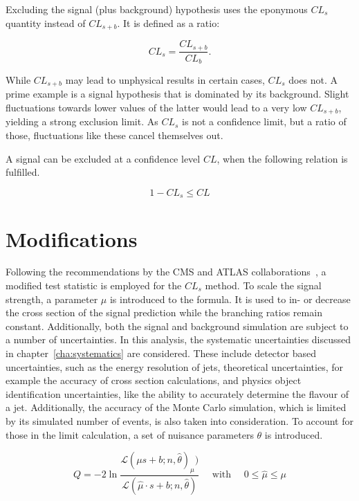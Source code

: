 Excluding the signal (plus background) hypothesis uses the eponymous $CL_s$ quantity instead of $CL_{s+b}$. It is defined as a ratio:

\begin{equation}
  \label{eq:cls}
  CL_s = \frac{CL_{s+b}}{CL_b}.
\end{equation}

\noindent While $CL_{s+b}$ may lead to unphysical results in certain cases, $CL_s$ does not. A prime example is a signal hypothesis that is dominated by its background. Slight fluctuations towards lower values of the latter would lead to a very low $CL_{s+b}$, yielding a strong exclusion limit. As $CL_s$ is not a confidence limit, but a ratio of those, fluctuations like these cancel themselves out.

A signal can be excluded at a confidence level $CL$, when the following relation is fulfilled.

\begin{equation}
  \label{eq:cl-excl}
  1 - CL_s \leq CL
\end{equation}

\section{Modifications}
\label{sec:mods}

Following the recommendations by the CMS and ATLAS collaborations~\cite{clsmod}, a modified test statistic is employed for the $CL_s$ method. To scale the signal strength, a parameter $\mu$ is introduced to the formula. It is used to in- or decrease the cross section of the signal prediction while the branching ratios remain constant. Additionally, both the signal and background simulation are subject to a number of uncertainties. In this analysis, the systematic uncertainties discussed in chapter~\ref{cha:systematics} are considered. These include detector based uncertainties, such as the energy resolution of jets, theoretical uncertainties, for example the accuracy of cross section calculations, and physics object identification uncertainties, like the ability to accurately determine the flavour of a jet. Additionally, the accuracy of the Monte Carlo simulation, which is limited by its simulated number of events, is also taken into consideration. To account for those in the limit calculation, a set of nuisance parameters $\theta$ is introduced.

\begin{equation}
  \label{eq:q-mod}
  Q = - 2 \ln{ \frac{\mathcal{L} (\mu s + b; n, \hat{\theta})_\mu) }{ \mathcal{L} (\hat{\mu} \cdot s + b; n, \hat{\theta} )} } \quad \text{ with } \quad 0 \leq \hat{\mu} \leq \mu
\end{equation}

